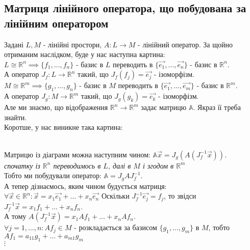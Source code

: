 \documentclass[a4paper, 10pt]{article}
\theoremstyle{theoremdd}
\theoremstyle{theoremdd}
\theoremstyle{theoremdd}
\theoremstyle{theoremdd}
\theoremstyle{theoremdd}
\theoremstyle{theoremdd}
\theoremstyle{theoremdd}
\theoremstyle{theoremdd}
\begin{document}
	\subsection{Матриця лінійного оператора, що побудована за лінійним оператором}
	Задані $L,M$ - лінійні простори, $A: L \to M$ - лінійний оператор. За щойно отриманим наслідком, буде у нас наступна картина:\\
	$L \cong \mathbb{R}^n \implies \{f_1,\dots,f_n\}$ - базис в $L$ переводить в $\{\vec{e_1},\dots,\vec{e_n}\}$ - базис в $\mathbb{R}^n$. \\ 
	А оператор $J_f: L \to \mathbb{R}^n$ такий, що $J_f(f_j) = \vec{e_j}$ - ізоморфізм.
	\bigskip \\
	$M \cong \mathbb{R}^m \implies \{g_1,\dots,g_n\}$ - базис в $M$ переводить в $\{\vec{e_1},\dots,\vec{e_m}\}$ - базис в $\mathbb{R}^m$. \\
	А оператор $J_g: M \to \mathbb{R}^m$ такий, що $J_g(g_k) = \vec{e_k}$ - ізоморфізм.\\
	Але ми знаємо, що відображення $\mathbb{R}^n \to \mathbb{R}^m$ задає матрицю $\mathbb{A}$. Якраз її треба знайти.
	\\
	Коротше, у нас виникне така картина:\\
	\\
	Матрицю із діаграми можна наступним чином: $\mathbb{A}\vec{x} = J_g(A(J^{-1}_f\vec{x}))$.\\
	\textit{спочатку із $\mathbb{R}^n$ переводимось в $L$, далі в $M$ і згодом в $\mathbb{R}^m$}\\
	Тобто ми побудували оператор: $\mathbb{A} = J_g A J_f^{-1}$.\\
	А тепер дізнаємось, яким чином будується матриця:\\
	$\forall \vec{x} \in \mathbb{R}^n: \vec{x} = x_1 \vec{e_1}+ \dots + x_n \vec{e_n}$
	Оскільки $J_f^{-1} \vec{e_j} = f_j$, то звідси $J_f^{-1} \vec{x} = x_1f_1+\dots+x_nf_n$. \\ А тому $A(J_f^{-1}\vec{x}) = x_1Af_1 + \dots + x_nAf_n$.\\
	$\forall j = 1,\dots,n: Af_j \in M$ - розкладається за базисом $\{g_1,\dots,g_m\}$ в $M$, тобто\\
	$Af_1 = a_{11}g_1 + \dots + a_{m1}g_m$\\
	$\vdots$\\
\end{document}
